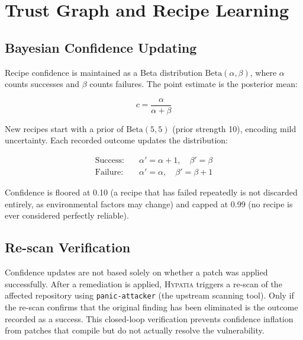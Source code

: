 \documentclass[11pt,a4paper]{article}
\begin{document}
\section{Trust Graph and Recipe Learning}
\label{sec:trust}

\subsection{Bayesian Confidence Updating}

Recipe confidence is maintained as a Beta distribution $\text{Beta}(\alpha, \beta)$, where $\alpha$ counts successes and $\beta$ counts failures. The point estimate is the posterior mean:

\begin{equation}
c = \frac{\alpha}{\alpha + \beta}
\label{eq:bayesian}
\end{equation}

New recipes start with a prior of $\text{Beta}(5, 5)$ (prior strength 10), encoding mild uncertainty. Each recorded outcome updates the distribution:

\begin{equation}
\begin{aligned}
\text{Success:} \quad & \alpha' = \alpha + 1, \quad \beta' = \beta \\
\text{Failure:} \quad & \alpha' = \alpha, \quad \beta' = \beta + 1
\end{aligned}
\label{eq:update}
\end{equation}

Confidence is floored at 0.10 (a recipe that has failed repeatedly is not discarded entirely, as environmental factors may change) and capped at 0.99 (no recipe is ever considered perfectly reliable).

\subsection{Re-scan Verification}

Confidence updates are not based solely on whether a patch was applied successfully. After a remediation is applied, \textsc{Hypatia} triggers a re-scan of the affected repository using \texttt{panic-attacker} (the upstream scanning tool). Only if the re-scan confirms that the original finding has been eliminated is the outcome recorded as a success. This closed-loop verification prevents confidence inflation from patches that compile but do not actually resolve the vulnerability.
\end{document}
